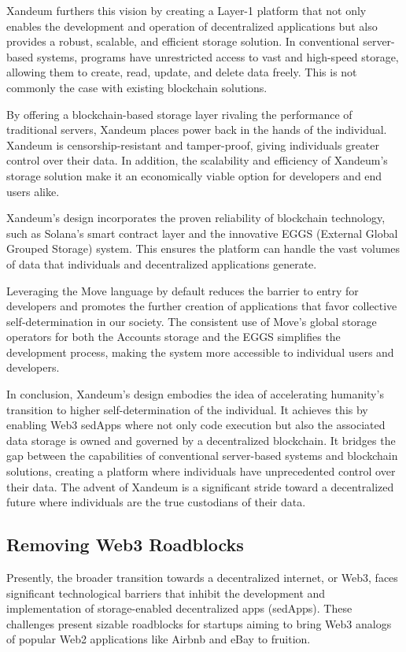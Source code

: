 \documentclass[11 pt]{article}   	%
\begin{document}
Xandeum furthers this vision by creating a Layer-1 platform that not only enables the development and operation of decentralized applications but also provides a robust, scalable, and efficient storage solution. In conventional server-based systems, programs have unrestricted access to vast and high-speed storage, allowing them to create, read, update, and delete data freely. This is not commonly the case with existing blockchain solutions.

By offering a blockchain-based storage layer rivaling the performance of traditional servers, Xandeum places power back in the hands of the individual. Xandeum is censorship-resistant and tamper-proof, giving individuals greater control over their data. In addition, the scalability and efficiency of Xandeum's storage solution make it an economically viable option for developers and end users alike.

Xandeum's design incorporates the proven reliability of blockchain technology, such as Solana's smart contract layer and the innovative EGGS (External Global Grouped Storage) system. This ensures the platform can handle the vast volumes of data that individuals and decentralized applications generate.

Leveraging the Move language \cite{shamanaev20} by default reduces the barrier to entry for developers and promotes the further creation of applications that favor collective self-determination in our society. The consistent use of Move's global storage operators for both the Accounts storage and the EGGS simplifies the development process, making the system more accessible to individual users and developers.

In conclusion, Xandeum's design embodies the idea of accelerating humanity's transition to higher self-determination of the individual. It achieves this by enabling Web3 sedApps where not only code execution but also the associated data storage is owned and governed by a decentralized blockchain. It bridges the gap between the capabilities of conventional server-based systems and blockchain solutions, creating a platform where individuals have unprecedented control over their data. The advent of Xandeum is a significant stride toward a decentralized future where individuals are the true custodians of their data.

\subsection{Removing Web3 Roadblocks}
Presently, the broader transition towards a decentralized internet, or Web3, faces significant technological barriers that inhibit the development and implementation of storage-enabled decentralized apps (sedApps). These challenges present sizable roadblocks for startups aiming to bring Web3 analogs of popular Web2 applications like Airbnb and eBay to fruition.
\end{document}
